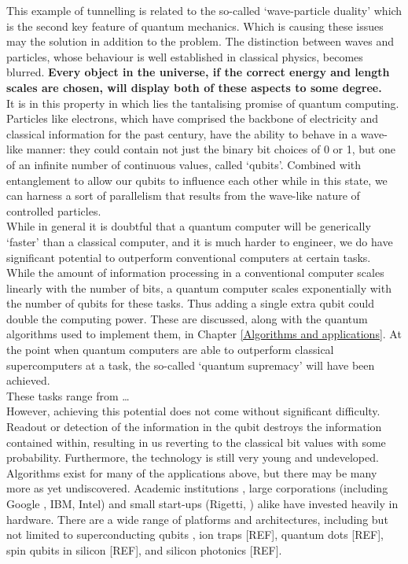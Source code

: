 This example of tunnelling is related to the so-called `wave-particle duality' which is the second key feature of quantum mechanics. Which is causing these issues may the solution in addition to the problem. The distinction between waves and particles, whose behaviour is well established in classical physics, becomes blurred. \textbf{Every object in the universe, if the correct energy and length scales are chosen, will display both of these aspects to some degree.} \\

It is in this property in which lies the tantalising promise of quantum computing. Particles like electrons, which have comprised the backbone of electricity and classical information for the past century, have the ability to behave in a wave-like manner: they could contain not just the binary bit choices of 0 or 1,  but one of an infinite number of continuous values, called `qubits'. Combined with entanglement to allow our qubits to influence each other while in this state, we can harness a sort of parallelism that results from the wave-like nature of controlled particles.  \\


While in general it is doubtful that a quantum computer will be generically  `faster' than a classical computer, and it is much harder to engineer, we do have significant potential to outperform conventional computers at certain tasks. While the amount of information processing in a conventional computer scales linearly with the number of bits, a quantum computer scales exponentially with the number of qubits for these tasks. Thus adding a single extra qubit could double the computing power. These are discussed, along with the quantum algorithms used to implement them, in Chapter \autoref{Algorithms and applications}. At the point when quantum computers are able to outperform classical supercomputers at a task, the so-called `quantum supremacy' will have been achieved. \\

These tasks range from \ldots\\ 

 

However, achieving this potential does not come without significant difficulty. Readout or detection of the information in the qubit destroys the information contained within, resulting in us reverting to the classical bit values with some probability. Furthermore, the technology is still very young and undeveloped. Algorithms exist for many of the applications above, but there may be many more as yet undiscovered. Academic institutions , large corporations (including Google \cite{bristlecone}, IBM, Intel) and small start-ups (Rigetti, \cite{rigettihome}) alike have invested heavily in hardware. There are a wide range of platforms and architectures, including but not limited to superconducting qubits \cite{bristlecone}, ion traps [REF], quantum dots [REF], spin qubits in silicon [REF], and silicon photonics [REF]. \\


